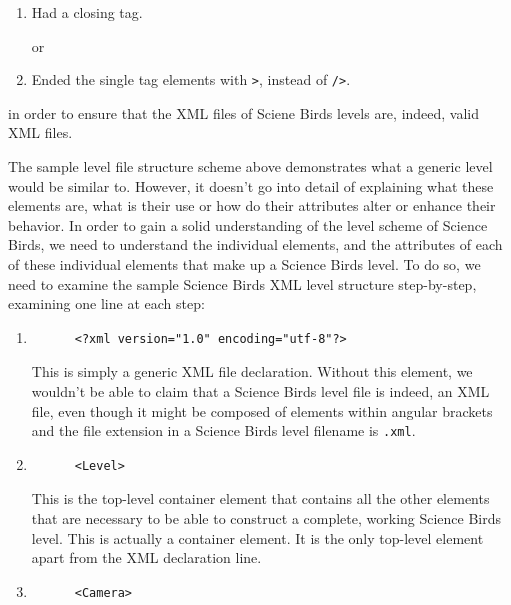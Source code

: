\documentclass{dalthesis}
\begin{document}
\begin{enumerate}
  \begin{enumerate}
    \item Had a closing tag.

    or

    \item Ended the single tag elements with \lstinline{>}, instead of \lstinline{/>}.
  \end{enumerate}

  in order to ensure that the XML files of Sciene Birds levels are, indeed, valid XML files.

  The sample level file structure scheme above demonstrates what a generic level would be similar to. However, it doesn't go into detail of explaining what these elements are, what is their use or how do their attributes alter or enhance their behavior. In order to gain a solid understanding of the level scheme of Science Birds, we need to understand the individual elements, and the attributes of each of these individual elements that make up a Science Birds level. To do so, we need to examine the sample Science Birds XML level structure step-by-step, examining one line at each step:

  \begin{enumerate}
    \item

    \begin{lstlisting}
      <?xml version="1.0" encoding="utf-8"?>
    \end{lstlisting}

    This is simply a generic XML file declaration. Without this element, we wouldn't be able to claim that a Science Birds level file is indeed, an XML file, even though it might be composed of elements within angular brackets and the file extension in a Science Birds level filename is \lstinline{.xml}.

    \item

    \begin{lstlisting}
      <Level>
    \end{lstlisting}

    This is the top-level container element that contains all the other elements that are necessary to be able to construct a complete, working Science Birds level. This is actually a container element. It is the only top-level element apart from the XML declaration line.

    \item

    \begin{lstlisting}
      <Camera>
    \end{lstlisting}


\end{enumerate}
\end{enumerate}
\end{document}
